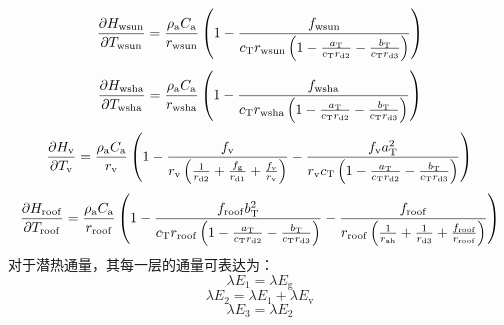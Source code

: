 %
\begin{equation}
  \frac{\partial H_{\mathrm{wsun}}}{\partial T_{\mathrm{wsun}}} = \frac{\rho _{\rm a} C_{\mathrm a}}{r_{\mathrm{wsun}}} \left(1-\frac{f_{\mathrm{wsun}}}{c_{\mathrm{T}} r_{\mathrm{wsun}} \left(1-\frac{a_{\mathrm{T}}}{c_{\mathrm{T}} r_{\mathrm{d2}}}-\frac{b_{\mathrm{T}}}{c_{\mathrm{T}} r_{\mathrm{d3}}}\right)}\right)
\end{equation}
%
\begin{equation}
  \frac{\partial H_{\mathrm{wsha}}}{\partial T_{\mathrm{wsha}}} = \frac{\rho _{\rm a} C_{\mathrm a}}{r_{\mathrm{wsha}}} \left(1-\frac{f_{\mathrm{wsha}}}{c_{\mathrm{T}} r_{\mathrm{wsha}} \left(1-\frac{a_{\mathrm{T}}}{c_{\mathrm{T}} r_{\mathrm{d2}}}-\frac{b_{\mathrm{T}}}{c_{\mathrm{T}} r_{\mathrm{d3}}}\right)}\right)
\end{equation}
%
\begin{equation}
  \frac{\partial H_{\mathrm{v}}}{\partial T_{\mathrm{v}}} = \frac{\rho _{\rm a} C_{\mathrm a}}{r_{\mathrm{v}}} \left(1-\frac{f_{\rm v}}{r_{\mathrm{v}} \left(\frac{1}{r_{\mathrm{d2}}}+\frac{f_{\rm g}}{r_{\mathrm{d1}}}+\frac{f_{\rm v}}{r_{\rm v}}\right)} - \frac{f_{\rm v} a_{\mathrm{T}}^2}{r_{\mathrm{v}} c_{\mathrm{T}} \left(1-\frac{a_{\mathrm{T}}}{c_{\mathrm{T}} r_{\mathrm{d2}}}-\frac{b_{\mathrm{T}}}{c_{\mathrm{T}} r_{\mathrm{d3}}}\right)}\right)
\end{equation}
%
\begin{equation}
  \frac{\partial H_{\mathrm{roof}}}{\partial T_{\mathrm{roof}}} = \frac{\rho _{\rm a} C_{\mathrm a}}{r_{\mathrm{roof}}} \left(1-\frac{f_{\mathrm{roof}} b_{\mathrm{T}}^2}{c_{\mathrm{T}} r_{\mathrm{roof}} \left(1-\frac{a_{\mathrm{T}}}{c_{\mathrm{T}} r_{\mathrm{d2}}}-\frac{b_{\mathrm{T}}}{c_{\mathrm{T}} r_{\mathrm{d3}}}\right)}-\frac{f_{\mathrm{roof}}}{r_{\mathrm{roof}}\left(\frac{1}{r_{\mathrm{ah}}}+\frac{1}{r_{\mathrm{d3}}}+\frac{f_{\mathrm{roof}}}{r_{\mathrm{roof}}}\right)}\right)
\end{equation}
对于潜热通量，其每一层的通量可表达为：
%
\begin{equation}\label{3lay_L1_veg}
  \lambda E_{1} = \lambda E_{\mathrm{g}}
\end{equation}
%
\begin{equation}
  \lambda E_{2} = \lambda E_{1} + \lambda E_{\mathrm{v}}
\end{equation}
%
\begin{equation}\label{3lay_L2_veg}
  \lambda E_{3} = \lambda E_{2}
\end{equation}
